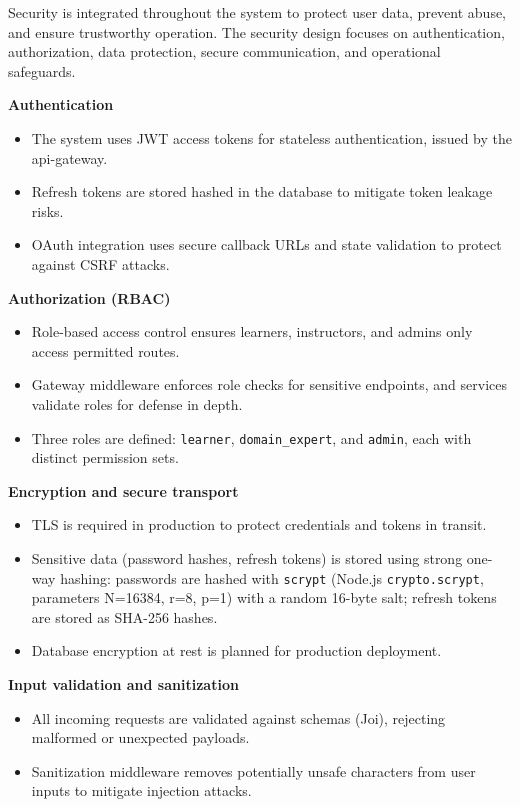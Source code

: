 Security is integrated throughout the system to protect user data, prevent abuse, and ensure trustworthy operation. The security design focuses on authentication, authorization, data protection, secure communication, and operational safeguards.

\textbf{Authentication}

\begin{itemize}
    \item The system uses JWT access tokens for stateless authentication, issued by the api-gateway.
    \item Refresh tokens are stored hashed in the database to mitigate token leakage risks.
    \item OAuth integration uses secure callback URLs and state validation to protect against CSRF attacks.
\end{itemize}

\textbf{Authorization (RBAC)}

\begin{itemize}
    \item Role-based access control ensures learners, instructors, and admins only access permitted routes.
    \item Gateway middleware enforces role checks for sensitive endpoints, and services validate roles for defense in depth.
    \item Three roles are defined: \texttt{learner}, \texttt{domain\_expert}, and \texttt{admin}, each with distinct permission sets.
\end{itemize}

\textbf{Encryption and secure transport}

\begin{itemize}
    \item TLS is required in production to protect credentials and tokens in transit.
    \item Sensitive data (password hashes, refresh tokens) is stored using strong one-way hashing: passwords are hashed with \texttt{scrypt} (Node.js \texttt{crypto.scrypt}, parameters N=16384, r=8, p=1) with a random 16-byte salt; refresh tokens are stored as SHA-256 hashes.
    \item Database encryption at rest is planned for production deployment.
\end{itemize}

\textbf{Input validation and sanitization}

\begin{itemize}
    \item All incoming requests are validated against schemas (Joi), rejecting malformed or unexpected payloads.
    \item Sanitization middleware removes potentially unsafe characters from user inputs to mitigate injection attacks.
\end{itemize}

